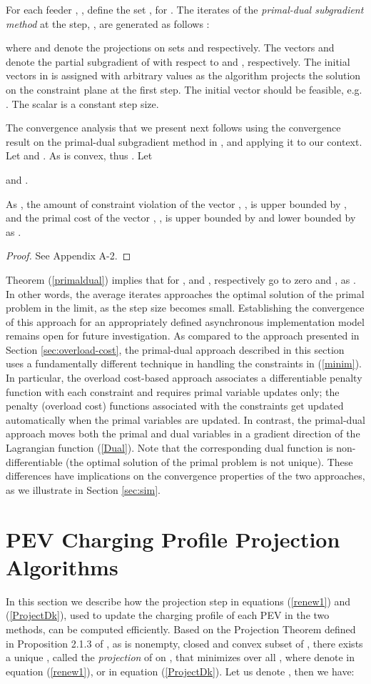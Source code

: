 \documentclass[12pt,draftcls,onecolumn]{IEEEtran}
\begin{document}
For each feeder , , define the set , for . The iterates of the \emph{primal-dual subgradient method} at the  step, , are generated as follows \cite{NO09,Z92}:


where  and  denote the projections on sets  and  respectively. The vectors  and  denote the partial subgradient of  with respect to  and , respectively. The initial vectors in   is assigned with arbitrary values as the algorithm projects the solution on the constraint plane  at the first step. The initial vector  should be feasible, e.g. . The scalar  is a constant step size.

The convergence analysis that we present next follows using the convergence result on the primal-dual subgradient method in \cite{NO09}, and applying it to our context. Let  and . As  is convex, thus . Let


and .
\begin{Thm}
As , the amount of constraint violation of the vector , , is upper bounded by , and the primal cost of the vector , , is upper bounded by  and lower bounded by  as .
\label{primaldual}
\end{Thm}
\begin{proof}
See Appendix A-2.
\end{proof}
\indent Theorem (\ref{primaldual}) implies that for ,  and , respectively go to zero and , as . In other words, the average iterates approaches the optimal solution of the primal problem in the limit, as the step size  becomes small. Establishing the convergence of this approach for an appropriately defined asynchronous implementation model remains open for future investigation. As compared to the approach presented in Section \ref{sec:overload-cost}, the primal-dual approach described in this section uses a fundamentally different technique in handling the constraints in (\ref{minim}). In particular, the overload cost-based approach associates a differentiable penalty function with each constraint and requires primal variable updates only; the penalty (overload cost) functions associated with the constraints get updated automatically when the primal variables are updated. In contrast, the primal-dual approach moves both the primal and dual variables in a gradient direction of the Lagrangian function (\ref{Dual}). Note that the corresponding dual function is non-differentiable (the optimal solution of the primal problem  is not unique). These differences have implications on the convergence properties of the two approaches, as we illustrate in Section \ref{sec:sim}.
\section{PEV Charging Profile Projection Algorithms}\label{sec:comp-algos}
\indent In this section we describe how the projection step in equations (\ref{renew1}) and (\ref{ProjectDk}), used to update the charging profile of each PEV in the two methods, can be computed efficiently. Based on the Projection Theorem defined in Proposition 2.1.3 of \cite{B99}, as  is nonempty, closed and convex subset of , there exists a unique , called the \emph{projection} of  on , that minimizes  over all , where  denote  in equation (\ref{renew1}), or  in equation (\ref{ProjectDk}). Let us denote , then we have:
\end{document}
